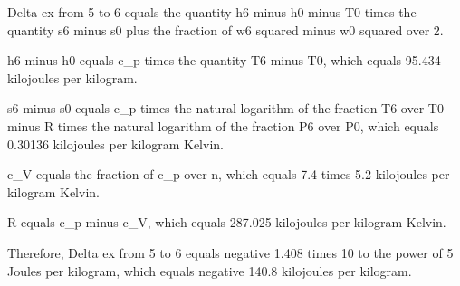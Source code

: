 Delta ex from 5 to 6 equals the quantity h6 minus h0 minus T0 times the quantity s6 minus s0 plus the fraction of w6 squared minus w0 squared over 2.

h6 minus h0 equals c_p times the quantity T6 minus T0, which equals 95.434 kilojoules per kilogram.

s6 minus s0 equals c_p times the natural logarithm of the fraction T6 over T0 minus R times the natural logarithm of the fraction P6 over P0, which equals 0.30136 kilojoules per kilogram Kelvin.

c_V equals the fraction of c_p over n, which equals 7.4 times 5.2 kilojoules per kilogram Kelvin.

R equals c_p minus c_V, which equals 287.025 kilojoules per kilogram Kelvin.

Therefore, Delta ex from 5 to 6 equals negative 1.408 times 10 to the power of 5 Joules per kilogram, which equals negative 140.8 kilojoules per kilogram.